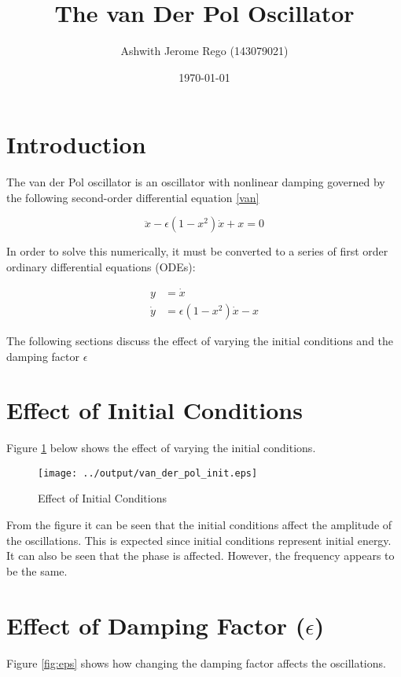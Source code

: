 \documentclass[12pt]{article}
\title{The van Der Pol Oscillator}
\author{Ashwith Jerome Rego (143079021)}
\date{\today}
\begin{document}
\maketitle

\section{Introduction}
The van der Pol oscillator is an oscillator with nonlinear damping
governed by the following second-order differential equation
\eqref{van}
\cite{scholar}

\begin{equation}
\ddot{x} - \epsilon \left(1 - x^2\right)\dot{x} + x = 0
\label{van}
\end{equation}

In order to solve this numerically, it must be converted to a series
of first order ordinary differential equations (ODEs):

\begin{align}
y &= \dot{x}\\
\dot{y} &= \epsilon \left(1 - x^2\right)\dot{x} - x 
\end{align}

The following sections discuss the effect of varying the initial
conditions and the damping factor $\epsilon$


\section{Effect of Initial Conditions}

Figure \ref{fig:init} below shows the effect of varying the initial
conditions.

\begin{figure}[H]
  \centering
  \texttt{[image: ../output/van\_der\_pol\_init.eps]}
  \caption{Effect of Initial Conditions}
  \label{fig:init}
\end{figure}

From the figure it can be seen that the initial conditions affect the
amplitude of the oscillations. This is expected since initial
conditions represent initial energy. It can also be seen that the
phase is affected. However, the frequency appears to be the same.

\section{Effect of Damping Factor ($\epsilon$)}

Figure \ref{fig:eps} shows how changing the damping factor affects
the oscillations.
\end{document}
